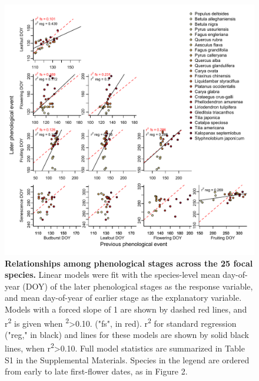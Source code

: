 \documentclass{article}
\begin{document}
  \begin{figure}[h]
  \centering
  \includegraphics{../analyses/figures/Hyp1_forcedslope_samerange.pdf}
  
  \caption{\textbf{Relationships among phenological stages across the 25 focal species.} Linear models were fit with the species-level mean day-of-year (DOY) of the later phenological stages as the response variable, and mean day-of-year of earlier stage as the explanatory variable. Models with a forced slope of 1 are shown by dashed red lines, and r\textsuperscript{2} is given when \textsuperscript{2}>0.10. ("fs", in red).  r\textsuperscript{2} for standard regression ("reg," in black) and lines for these models are shown by solid black lines, when r\textsuperscript{2}>0.10.  Full model statistics are summarized in Table S1 in the Supplemental Materials. Species in the legend are ordered from early to late first-flower dates, as in Figure 2.} %
  \label{fig:latevearly}
\end{figure}
\end{document}
